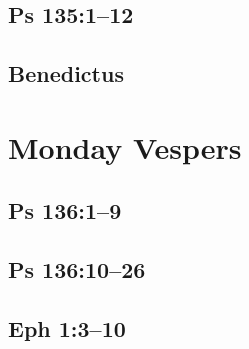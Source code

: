 \subsection{Ps 135:1--12}

{%
\parindent 0pt
\noindent
\ifx\preLilyPondExample \undefined
\else
  \expandafter\preLilyPondExample
\fi
\def\lilypondbook{}%

\ifx\postLilyPondExample \undefined
\else
  \expandafter\postLilyPondExample
\fi
}

\subsection{Benedictus}

{%
\parindent 0pt
\noindent
\ifx\preLilyPondExample \undefined
\else
  \expandafter\preLilyPondExample
\fi
\def\lilypondbook{}%

\ifx\postLilyPondExample \undefined
\else
  \expandafter\postLilyPondExample
\fi
}


\section{Monday Vespers}

\subsection{Ps 136:1--9}

{%
\parindent 0pt
\noindent
\ifx\preLilyPondExample \undefined
\else
  \expandafter\preLilyPondExample
\fi
\def\lilypondbook{}%

\ifx\postLilyPondExample \undefined
\else
  \expandafter\postLilyPondExample
\fi
}

\subsection{Ps 136:10--26}

{%
\parindent 0pt
\noindent
\ifx\preLilyPondExample \undefined
\else
  \expandafter\preLilyPondExample
\fi
\def\lilypondbook{}%

\ifx\postLilyPondExample \undefined
\else
  \expandafter\postLilyPondExample
\fi
}

\subsection{Eph 1:3--10}

{%
\parindent 0pt
\noindent
\ifx\preLilyPondExample \undefined
\else
  \expandafter\preLilyPondExample
\fi
\def\lilypondbook{}%

\ifx\postLilyPondExample \undefined
\else
  \expandafter\postLilyPondExample
\fi
}

